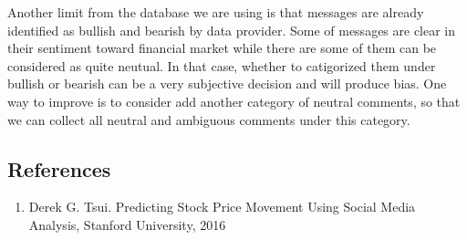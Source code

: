 \documentclass[]{article}
\providecommand{\tightlist}{%
  \setlength{\itemsep}{0pt}\setlength{\parskip}{0pt}}
\begin{document}
Another limit from the database we are using is that messages are
already identified as bullish and bearish by data provider. Some of
messages are clear in their sentiment toward financial market while
there are some of them can be considered as quite neutual. In that case,
whether to catigorized them under bullish or bearish can be a very
subjective decision and will produce bias. One way to improve is to
consider add another category of neutral comments, so that we can
collect all neutral and ambiguous comments under this category.

\newpage

\subsection{References}\label{references}

\begin{enumerate}
\def\labelenumi{\arabic{enumi}.}
\tightlist
\item
  Derek G. Tsui. Predicting Stock Price Movement Using Social Media
  Analysis, Stanford University, 2016
\end{enumerate}
\end{document}
